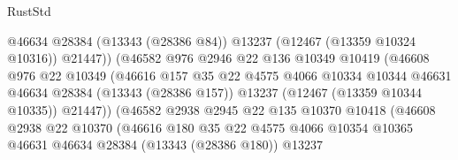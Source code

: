 \begin{lexlean}{RustStd}
\begin{coremodule}
                                      @46634
                                      @28384
                                      (@13343 (@28386 @84))
                                      @13237
                                      (@12467 (@13359 @10324 @10316))
                                      @21447))
                                  (@46582
                                    @976
                                    @2946
                                    @22
                                    @136
                                    @10349
                                    @10419
                                    (@46608
                                      @976
                                      @22
                                      @10349
                                      (@46616
                                        @157
                                        @35
                                        @22
                                        @4575
                                        @4066
                                        @10334
                                        @10344
                                        @46631
                                        @46634
                                        @28384
                                        (@13343 (@28386 @157))
                                        @13237
                                        (@12467 (@13359 @10344 @10335))
                                        @21447))
                                    (@46582
                                      @2938
                                      @2945
                                      @22
                                      @135
                                      @10370
                                      @10418
                                      (@46608
                                        @2938
                                        @22
                                        @10370
                                        (@46616
                                          @180
                                          @35
                                          @22
                                          @4575
                                          @4066
                                          @10354
                                          @10365
                                          @46631
                                          @46634
                                          @28384
                                          (@13343 (@28386 @180))
                                          @13237

\end{coremodule}
\end{lexlean}
